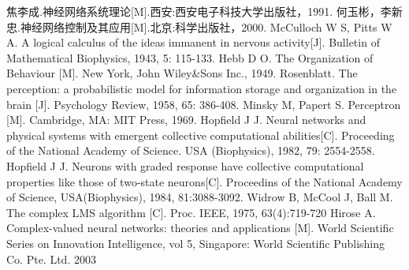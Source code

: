 \documentclass[no-math, withoutpreface]{YangThesis}
\begin{document}
\newpage
\begin{thebibliography}{9}

 焦李成.神经网络系统理论[M].西安:西安电子科技大学出版社，1991.
 何玉彬，李新忠.神经网络控制及其应用[M].北京:科学出版社，2000.
 McCulloch W S, Pitts W A. A logical calculus of the ideas immanent in nervous activity[J]. Bulletin of Mathematical Biophysics, 1943, 5: 115-133.
 Hebb D O. The Organization of Behaviour [M]. New York, John Wiley\&Sons Inc., 1949.
 Rosenblatt. The perception: a probabilistic model for information storage and organization in the brain [J]. Psychology Review, 1958, 65: 386-408.
 Minsky M, Papert S. Perceptron [M]. Cambridge, MA: MIT Press, 1969.
 Hopf\/ield  J  J.  Neural  networks  and  physical  systems  with  emergent  collective computational  abilities[C].  Proceeding  of the National Academy  of  Science.  USA (Biophysics), 1982, 79: 2554-2558.
 Hopf\/ield J J. Neurons with graded response have collective computational properties like those  of  two-state  neurons[C].  Proceedins  of  the  National  Academy  of  Science, USA(Biophysics), 1984, 81:3088-3092.
 Widrow B, McCool J, Ball M. The complex LMS algorithm [C]. Proc. IEEE, 1975, 63(4):719-720
 Hirose  A.  Complex-valued  neural  networks:  theories  and  applications  [M].  World Scientif\/ic Series on Innovation Intelligence, vol 5, Singapore: World Scientif\/ic Publishing Co. Pte. Ltd. 2003


\end{thebibliography}
\end{document}
